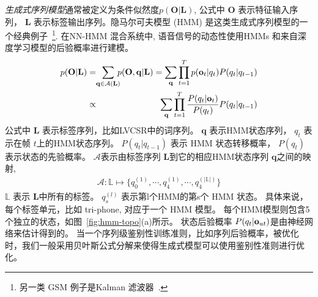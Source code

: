 {\em 生成式序列模型}通常被定义为条件似然度$p(\mathbf{O}|\mathbf{L})$, 公式中 ${\mathbf O}$ 表示特征输入序列， $\mathbf L$ 表示标签输出序列。隐马尔可夫模型 (HMM) 是这类生成式序列模型的一个经典例子~\footnote{另一类 GSM 例子是Kalman 滤波器~\cite{digalakis1991dynamical,abbeel2005discriminative}.}. 
在NN-HMM 混合系统中, 语音信号的动态性使用HMMs 和来自深度学习模型的后验概率进行建模。
\begin{eqnarray}
\label{equ:hmm-model_2}
p(\mathbf{O}|\mathbf{L})&=&\!\!\!\!\!\!\sum_{\mathbf{q}\in\mathcal{A}(\mathbf{L})}\!\!\!p(\mathbf{O},\mathbf{q}|{\mathbf L}) =\sum_{\mathbf{q}}\prod_{t=1}^{T} p({\bf o}_{t}|q_t) P(q_t|q_{t-1})\nonumber\\
&\propto&\sum_{\mathbf{q}}\prod_{t=1}^{T} \frac{P(q_t|{\bf o}_{t})}{P(q_t)}P(q_t|q_{t-1})
\end{eqnarray}
公式中 $\mathbf{L}$ 表示标签序列，比如LVCSR中的词序列。
$\mathbf{q}$ 表示HMM状态序列，  $q_t$ 表示在帧 $t$上的HMM状态序列。 $P(q_t|q_{t-1})$ 表示 HMM 状态转移概率， $P(q_t)$表示状态的先验概率。
$\mathcal{A}$表示由标签序列 $\mathbf{L}$到它的相应HMM状态序列 $\mathbf{q}$之间的映射,
\begin{equation}
\label{equ:a-func_2}
\begin{split}
\mathcal{A}:\mathbb{L}  \mapsto \{ q_0^{(1)},\cdots,q_4^{(1)},\cdots,q_4^{(|\mathbb{L}|)} \}
\end{split}
\end{equation}
$\mathbb{L}$ 表示 $\mathbf{L}$中所有的标签。 $q_s^{(l)}$ 表示第l个HMM的第s个 HMM 状态。
具体来说，每个标签单元，比如 tri-phone, 对应于一个 HMM 模型。
每个HMM模型则包含5个独立的状态，如图~\ref{fig:hmm-topo}(a)所示。
状态后验概率 $P(q_t|{\bf o}_{ut})$是由神经网络来估计得到的。
当一个序列级鉴别性训练准则，比如序列后验概率，被优化时，我们一般采用贝叶斯公式分解来使得生成式模型可以使用鉴别性准则进行优化。



